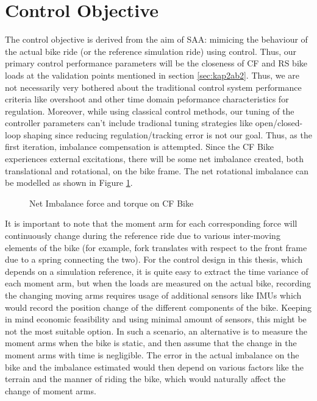 \section{Control Objective}
\label{sec:chap3sec1}
The control objective is derived from the aim of SAA: mimicing the behaviour of the actual bike ride (or the reference simulation ride) using control. Thus, our primary control performance parameters will be the closeness of CF and RS bike loads at the validation points mentioned in section \ref{sec:kap2ab2}.
Thus, we are not necessarily very bothered about the traditional control system performance criteria like overshoot and other time domain peformance characteristics for regulation. Moreover, while using classical control methods, our tuning of the controller parameters can't include tradional tuning strategies like open/closed-loop shaping since reducing regulation/tracking error is not our goal. 
Thus, as the first iteration, imbalance compensation is attempted. Since the CF Bike experiences external excitations, there will be some net imbalance created, both translational and rotational, on the bike frame. The net rotational imbalance can be modelled as shown in Figure \ref{fig:imbalance1}.
\begin{figure}[h!]
	\centering
	
	\caption{Net Imbalance force and torque on CF Bike}
	\label{fig:imbalance1}
\end{figure}
 It is important to note that the moment arm for each corresponding force will continuously change during the reference ride due to various inter-moving elements of the bike (for example, fork translates with respect to the front frame due to a spring connecting the two). For the control design in this thesis, which depends on a simulation reference, it is quite easy to extract the time variance of each moment arm, but when the loads are measured on the actual bike, recording the changing moving arms requires usage of additional sensors like IMUs which would record the position change of the different components of the bike. Keeping in mind economic feasibility and using minimal amount of sensors, this might be not the most suitable option. In such a scenario, an alternative is to measure the moment arms when the bike is static, and then assume that the change in the moment arms with time is negligible. The error in the actual imbalance on the bike and the imbalance estimated would then depend on various factors like the terrain and the manner of riding the bike, which would naturally affect the change of moment arms.


